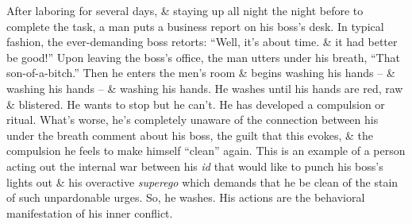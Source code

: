 \documentclass{article}
\numberwithin{equation}{section}
\begin{document}
\begin{itemize}
\begin{enumerate}
		After laboring for several days, \& staying up all night the night before to complete the task, a man puts a business report on his boss's desk. In typical fashion, the ever-demanding boss retorts: ``Well, it's about time. \& it had better be good!'' Upon leaving the boss's office, the man utters under his breath, ``That son-of-a-bitch.'' Then he enters the men's room \& begins washing his hands -- \& washing his hands -- \& washing his hands. He washes until his hands are red, raw \& blistered. He wants to stop but he can't. He has developed a compulsion or ritual. What's worse, he's completely unaware of the connection between his under the breath comment about his boss, the guilt that this evokes, \& the compulsion he feels to make himself ``clean'' again. This is an example of a person acting out the internal war between his \textit{id} that would like to punch his boss's lights out \& his overactive \textit{superego} which demands that he be clean of the stain of such unpardonable urges. So, he washes. His actions are the behavioral manifestation of his inner conflict.
		

\end{enumerate}
\end{itemize}
\end{document}
